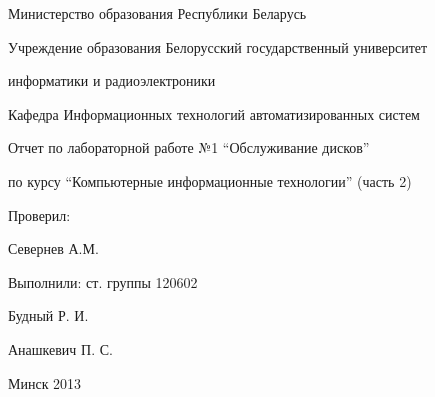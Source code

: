 \thispagestyle{empty}

\begin{center}
Министерство образования Республики Беларусь\par
\vspace{4mm}
Учреждение образования Белорусский государственный университет\par
информатики и радиоэлектроники\par 
\vspace{4mm}
Кафедра Информационных технологий автоматизированных систем\par
\par

\end{center}

\vspace{50mm}

\begin{center}
Отчет по лабораторной работе №1 ``Обслуживание дисков''\par
по курсу ``Компьютерные информационные технологии'' (часть 2)\par
\end{center}

\vspace{50mm}

\begin{multicols}{2}
\begin{flushleft}
Проверил: 

Севернев А.М. 
\vspace{4mm}
\end{flushleft}
\begin{flushright}
Выполнили: ст. группы 120602

Будный Р. И.

Анашкевич П. С.
\end{flushright}
\end{multicols}

\vspace{50mm}
\begin{center}
{Минск 2013}
\end{center}

\newpage
